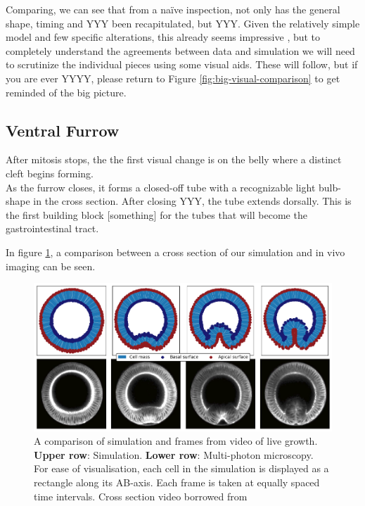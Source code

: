Comparing, we can see that from a naïve inspection, not only has the general shape, timing and YYY been recapitulated, but YYY.  Given the relatively simple model and few specific alterations, this already seems impressive , but to completely understand the agreements between data and simulation we will need to scrutinize the individual pieces using some visual aids. These will follow, but if you are ever YYYY, please return to Figure \ref{fig:big-visual-comparison} to get reminded of the big picture. 

\subsection{Ventral Furrow}
After mitosis stops, the the first visual change is on the belly where a distinct cleft begins forming. \\
As the furrow closes, it forms a closed-off tube with a recognizable light bulb-shape in the cross section. After closing YYY, the tube extends dorsally. This is the first building block [something] for the tubes that will become the gastrointestinal tract.

In figure \ref{fig:VFComparison}, a comparison between a cross section of our simulation and in vivo imaging can be seen.

\begin{figure}[H]
    \centering
    \includegraphics[width=1\linewidth]{chapters/Results/figures/VF_comparison.png}
    \caption{A comparison of simulation and frames from video of live growth. \\\textbf{Upper row}: Simulation. \textbf{Lower row}: Multi-photon microscopy. \\For ease of visualisation, each cell in the simulation is displayed as a rectangle along its AB-axis. Each frame is taken at equally spaced time intervals. Cross section video borrowed from \cite{conte2012biomechanical}}
    \label{fig:VFComparison}
\end{figure}


